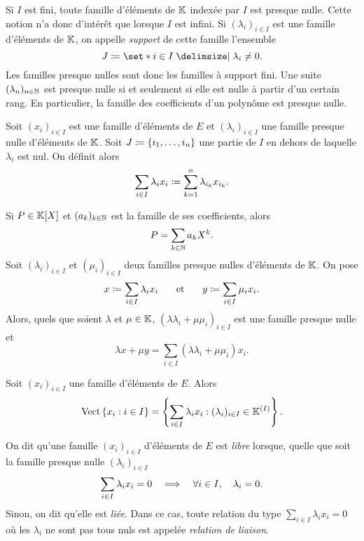 \documentclass{magnolia}
\begin{document}
\begin{remarques}
\remarque Si $I$ est fini, toute famille d'éléments de $\mathbb{K}$ indexée par $I$ est presque
  nulle. Cette notion n'a donc d'intérêt que lorsque $I$ est infini.
\remarque Si $(\lambda_i)_{i\in I}$ est une famille d'éléments de $\mathbb{K}$, on appelle
  \emph{support} de cette famille l'ensemble
  \[J\defeq\enstq{i\in I}{\lambda_i \neq 0}.\]
  Les familles presque nulles sont donc les familles à support fini.
\remarque Une suite $(\lambda_n)_{n\in\mathbb{N}}$ est presque nulle si et seulement si elle est
  nulle à partir d'un certain rang. En particulier, la famille des coefficients d'un
  polynôme est presque nulle.
\end{remarques}

\begin{definition}
Soit $(x_i)_{i\in I}$ est une famille d'éléments de $E$ et $(\lambda_i)_{i\in I}$ une
famille presque nulle d'éléments de $\mathbb{K}$. Soit $J\coloneqq\left\{i_1,\ldots,i_n\right\}$ une partie
de $I$ en dehors de laquelle $\lambda_i$ est nul. On définit alors
\[\sum_{i\in I} \lambda_i x_i \coloneqq \sum_{k=1}^n \lambda_{i_k} x_{i_k}.\]
\end{definition}

\begin{remarques}
\remarque Si $P\in\polyK$ et $(a_k)_{k\in\mathbb{N}}$ est la famille de ses coefficients, alors
  \[P=\sum_{k\in\mathbb{N}} a_k X^k.\]
\remarque Soit $(\lambda_i)_{i\in I}$ et $(\mu_i)_{i\in I}$ deux familles presque nulles d'éléments de $\mathbb{K}$. On pose
  \[x\coloneqq\sum_{i\in I} \lambda_i x_i \quad\quad\!\text{et}\quad\!\quad y\coloneqq\sum_{i\in I} \mu_i x_i.\]
  Alors, quels que soient $\lambda$ et $\mu\in\mathbb{K}$, $(\lambda\lambda_i+\mu\mu_i)_{i\in I}$ est une famille
  presque nulle et
  \[\lambda x+\mu y=\sum_{i\in I} (\lambda \lambda_i+\mu \mu_i)x_i.\]
\end{remarques}


\begin{proposition}
Soit $(x_i)_{i\in I}$ une famille d'éléments de $E$. Alors
\[\operatorname{Vect}\left\{x_i : i\in I\right\}=\left\{\sum_{i\in I} \lambda_i x_i : (\lambda_i)_{i\in I} \in \mathbb{K}^{(I)}\right\}.\]
\end{proposition}

\begin{definition}[utile=-3]
On dit qu'une famille $(x_i)_{i\in I}$ d'éléments de $E$ est \emph{libre} lorsque, quelle que soit la famille
presque nulle $(\lambda_i)_{i\in I}$
\[\sum_{i\in I} \lambda_i x_i=0 \quad\Longrightarrow\quad \forall i\in I,\quad \lambda_i=0.\]
Sinon, on dit qu'elle est \emph{liée}. Dans ce cas, toute relation du type
$\sum_{i\in I} \lambda_i x_i=0$ où les $\lambda_i$ ne sont pas tous nuls est appelée \emph{relation de liaison}.
\end{definition}
\end{document}
